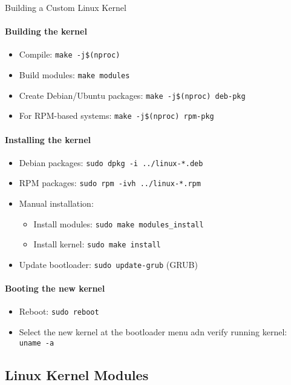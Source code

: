 \begin{KR}{Building a Custom Linux Kernel}
    \paragraph{Building the kernel}
    \begin{itemize}
        \item Compile: \texttt{make -j\$(nproc)}
        \item Build modules: \texttt{make modules}
        \item Create Debian/Ubuntu packages: \texttt{make -j\$(nproc) deb-pkg}
        \item For RPM-based systems: \texttt{make -j\$(nproc) rpm-pkg}
    \end{itemize}
    
    \paragraph{Installing the kernel}
    \begin{itemize}
        \item Debian packages: \texttt{sudo dpkg -i ../linux-*.deb}
        \item RPM packages: \texttt{sudo rpm -ivh ../linux-*.rpm}
        \item Manual installation:
            \begin{itemize}
                \item Install modules: \texttt{sudo make modules\_install}
                \item Install kernel: \texttt{sudo make install}
            \end{itemize}
        \item Update bootloader: \texttt{sudo update-grub} (GRUB)
    \end{itemize}
    
    \paragraph{Booting the new kernel}
    \begin{itemize}
        \item Reboot: \texttt{sudo reboot}
        \item Select the new kernel at the bootloader menu adn verify running kernel: \texttt{uname -a}
    \end{itemize}
\end{KR}

\subsection{Linux Kernel Modules}

